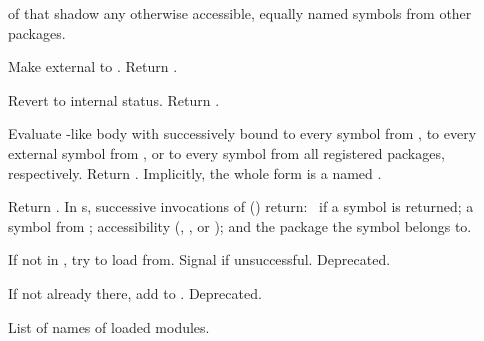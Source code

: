 \begin{LIST}{1cm}
  {
     of  that shadow any
    otherwise accessible, equally named symbols from other packages.
  }

  {
    Make  external to . Return \retval{\T}.
  }

  {
    Revert  to internal status. Return \retval{\T}.
  }
  
  {
    Evaluate -like body with  successively bound to every
    symbol from , to every external symbol from
    , or to every symbol from all registered packages, 
    respectively. Return .  Implicitly,
    the whole form is a  named \NIL. 
  }

  {
    Return . In s, successive
    invocations of  () return: \T\ if a symbol is returned;
    a symbol from ; accessibility
    (, , or ); and the
    package the symbol belongs to.
  }

  {
    If not in , try  to load
     from. Signal  if
    unsuccessful. Deprecated. 
  }

  {
    If not already there, add  to
    . Deprecated. 
  }

  {
    List of names of loaded modules.
  }

\end{LIST}


